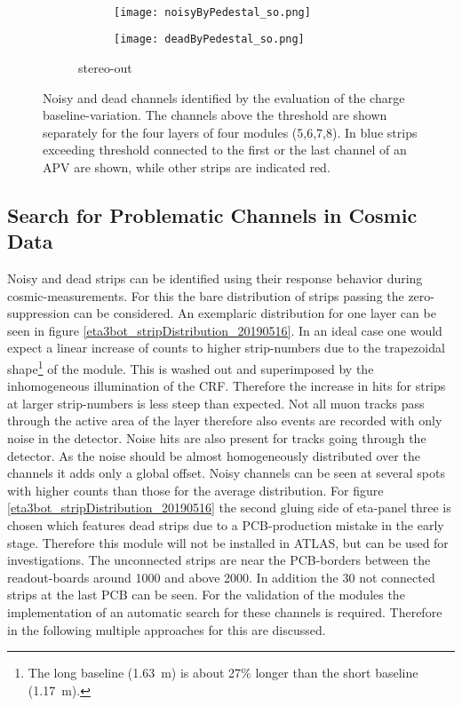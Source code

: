 \documentclass[
twoside,            %
BCOR1.4cm,          %
10pt,               %
headings=normal,    %
headsepline,        %
clearplainpage,		%
final,              %
div=14,
open=right,
bibliography=toc
]{scrreprt}
\begin{document}
\begin{figure}[!h]
	\vspace{1mm}
	\\
	\begin{subfigure}[b]{\textwidth}
		\begin{subfigure}[b]{0.49\textwidth}
			\centering
			\texttt{[image: noisyByPedestal\_so.png]}
		\end{subfigure}
		\hfill
		\begin{subfigure}[b]{0.49\textwidth}
			\centering
			\texttt{[image: deadByPedestal\_so.png]}
		\end{subfigure}
		\caption{
			stereo-out
		}
	\end{subfigure}
	\vspace{-4mm}
	\caption{
		Noisy and dead channels identified by the evaluation of the charge baseline-variation.
		The channels above the threshold are shown separately for the four layers of four modules (5,6,7,8).
		In blue strips exceeding threshold connected to the first or the last channel of an APV are shown, while other strips are indicated red.
	}
	\label{noisyByPedestal} 
\end{figure}

\subsection{Search for Problematic Channels in Cosmic Data}

Noisy and dead strips can be identified using their response behavior during cosmic-measurements.
For this the bare distribution of strips passing the zero-suppression can be considered.
An exemplaric distribution for one layer can be seen in figure \ref{eta3bot_stripDistribution_20190516}.
In an ideal case one would expect a linear increase of counts to higher strip-numbers due to the trapezoidal shape\footnote{
	The long baseline (\SI{1.63}{m}) is about 27\% longer than the short baseline (\SI{1.17}{m}).
} of the module.
This is washed out and superimposed by the inhomogeneous illumination of the CRF.
Therefore the increase in hits for strips at larger strip-numbers is less steep than expected.
Not all muon tracks pass through the active area of the layer therefore also events are recorded with only noise in the detector.
Noise hits are also present for tracks going through the detector.
As the noise should be almost homogeneously distributed over the channels it adds only a global offset.
Noisy channels can be seen at several spots with higher counts than those for the average distribution.
For figure \ref{eta3bot_stripDistribution_20190516} the second gluing side of eta-panel three is chosen which features dead strips due to a PCB-production mistake in the early stage.
Therefore this module will not be installed in ATLAS, but can be used for investigations.
The unconnected strips are near the PCB-borders between the readout-boards around 1000 and above 2000.
In addition the 30 not connected strips at the last PCB can be seen.
For the validation of the modules the implementation of an automatic search for these channels is required.
Therefore in the following multiple approaches for this are discussed.
\end{document}
